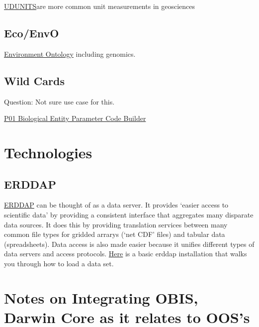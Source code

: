 \documentclass[
]{book}
\begin{document}
\href{https://www.unidata.ucar.edu/software/udunits/}{UDUNITS}are more common unit measurements in geosciences

\hypertarget{ecoenvo}{%
\subsection{Eco/EnvO}\label{ecoenvo}}

\href{http://www.obofoundry.org/ontology/envo.html}{Environment Ontology} including genomics.

\hypertarget{wild-cards}{%
\subsection{Wild Cards}\label{wild-cards}}

Question: Not sure use case for this.

\href{https://www.bodc.ac.uk/resources/vocabularies/vocabulary_builder/biomodel/}{P01 Biological Entity Parameter Code Builder}

\hypertarget{technologies}{%
\section{Technologies}\label{technologies}}

\hypertarget{erddap}{%
\subsection{ERDDAP}\label{erddap}}

\href{https://coastwatch.pfeg.noaa.gov/erddap/index.html}{ERDDAP} can be thought of as a data server. It provides `easier access to scientific data' by providing a consistent interface that aggregates many disparate data sources. It does this by providing translation services between many common file types for gridded arrarys (`net CDF' files) and tabular data (spreadsheets). Data access is also made easier because it unifies different types of data servers and access protocols. \href{https://github.com/HakaiInstitute/erddap-basic}{Here} is a basic erddap installation that walks you through how to load a data set.

\hypertarget{notes-on-integrating-obis-darwin-core-as-it-relates-to-ooss}{%
\section{Notes on Integrating OBIS, Darwin Core as it relates to OOS's}\label{notes-on-integrating-obis-darwin-core-as-it-relates-to-ooss}}
\end{document}
